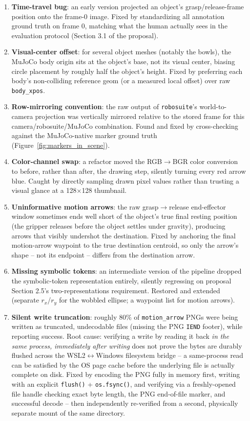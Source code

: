\documentclass[11pt]{article}
\begin{document}
\begin{enumerate}[nosep]
  \item \textbf{Time-travel bug}: an early version projected an object's grasp/release-frame position onto the frame-0 image. Fixed by standardizing all annotation ground truth on frame 0, matching what the human actually sees in the evaluation protocol (Section 3.1 of the proposal).
  \item \textbf{Visual-center offset}: for several object meshes (notably the bowls), the MuJoCo body origin sits at the object's base, not its visual center, biasing circle placement by roughly half the object's height. Fixed by preferring each body's non-colliding reference geom (or a measured local offset) over raw \texttt{body\_xpos}.
  \item \textbf{Row-mirroring convention}: the raw output of \texttt{robosuite}'s world-to-camera projection was vertically mirrored relative to the stored frame for this camera/robosuite/MuJoCo combination. Found and fixed by cross-checking against the MuJoCo-native marker ground truth (Figure~\ref{fig:markers_in_scene}).
  \item \textbf{Color-channel swap}: a refactor moved the RGB$\to$BGR color conversion to before, rather than after, the drawing step, silently turning every red arrow blue. Caught by directly sampling drawn pixel values rather than trusting a visual glance at a 128$\times$128 thumbnail.
  \item \textbf{Uninformative motion arrows}: the raw grasp$\to$release end-effector window sometimes ends well short of the object's true final resting position (the gripper releases before the object settles under gravity), producing arrows that visibly undershot the destination. Fixed by anchoring the final motion-arrow waypoint to the true destination centroid, so only the arrow's shape -- not its endpoint -- differs from the destination arrow.
  \item \textbf{Missing symbolic tokens}: an intermediate version of the pipeline dropped the symbolic-token representation entirely, silently regressing on proposal Section 2.5's two-representations requirement. Restored and extended (separate $r_x$/$r_y$ for the wobbled ellipse; a waypoint list for motion arrows).
  \item \textbf{Silent write truncation}: roughly 80\% of \texttt{motion\_arrow} PNGs were being written as truncated, undecodable files (missing the PNG \texttt{IEND} footer), while reporting success. Root cause: verifying a write by reading it back \emph{in the same process, immediately after writing} does not prove the bytes are durably flushed across the WSL2$\leftrightarrow$Windows filesystem bridge -- a same-process read can be satisfied by the OS page cache before the underlying file is actually complete on disk. Fixed by encoding the PNG fully in memory first, writing with an explicit \texttt{flush()} + \texttt{os.fsync()}, and verifying via a freshly-opened file handle checking exact byte length, the PNG end-of-file marker, and successful decode -- then independently re-verified from a second, physically separate mount of the same directory.
\end{enumerate}
\end{document}
